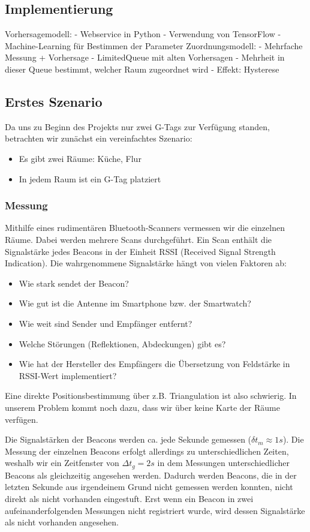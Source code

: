\subsection{Implementierung}

Vorhersagemodell:
- Webservice in Python
- Verwendung von TensorFlow
- Machine-Learning für Bestimmen der Parameter
Zuordnungsmodell:
- Mehrfache Messung + Vorhersage
- LimitedQueue mit alten Vorhersagen
- Mehrheit in dieser Queue bestimmt, welcher Raum zugeordnet wird
- Effekt: Hysterese

\subsection{Erstes Szenario}

Da uns zu Beginn des Projekts nur zwei G-Tags zur Verfügung standen, betrachten
wir zunächst ein vereinfachtes Szenario:
\begin{itemize}
	\item Es gibt zwei Räume: Küche, Flur
	\item In jedem Raum ist ein G-Tag platziert
\end{itemize}

\subsubsection{Messung}

Mithilfe eines rudimentären Bluetooth-Scanners vermessen wir die einzelnen Räume.
Dabei werden mehrere Scans durchgeführt. Ein Scan enthält die Signalstärke 
jedes Beacons in der Einheit RSSI (Received Signal Strength Indication).
Die wahrgenommene Signalstärke hängt von vielen Faktoren ab:
\begin{itemize}
	\item Wie stark sendet der Beacon?
	\item Wie gut ist die Antenne im Smartphone bzw. der Smartwatch?
	\item Wie weit sind Sender und Empfänger entfernt?
	\item Welche Störungen (Reflektionen, Abdeckungen) gibt es?
	\item Wie hat der Hersteller des Empfängers die Übersetzung von Feldstärke in RSSI-Wert implementiert?
\end{itemize}
Eine direkte Positionsbestimmung über z.B. Triangulation ist also schwierig.
In unserem Problem kommt noch dazu, dass wir über keine Karte der Räume
verfügen.

Die Signalstärken der Beacons werden ca. jede Sekunde gemessen ($\delta t_m \approx 1s$).
Die Messung der einzelnen Beacons erfolgt allerdings zu unterschiedlichen Zeiten,
weshalb wir ein Zeitfenster von $\Delta t_g = 2s$ in dem Messungen unterschiedlicher
Beacons als gleichzeitig angesehen werden. Dadurch werden Beacons, die in der letzten Sekunde aus irgendeinem Grund nicht gemessen werden konnten, nicht direkt als nicht vorhanden eingestuft.
Erst wenn ein Beacon in zwei aufeinanderfolgenden Messungen nicht registriert wurde, wird dessen Signalstärke als nicht vorhanden angesehen.

